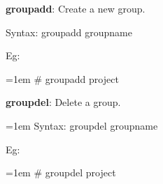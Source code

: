 \setlength{\columnsep}{3pt}
\begin{flushleft}
	
	\bigskip
	\textbf{groupadd}: Create a new group.
	\begin{tcolorbox}[breakable,notitle,boxrule=1pt,colback=pink,colframe=pink]
		\color{black}
		Syntax:  groupadd groupname
	\end{tcolorbox}
	Eg:
	\begin{tcolorbox}[breakable,notitle,boxrule=-0pt,colback=black,colframe=black]
		\color{green}
		\font=1em
		\# groupadd project
		\font=4pt
	\end{tcolorbox}

		
	\textbf{groupdel}: Delete a group.
	\begin{tcolorbox}[breakable,notitle,boxrule=0pt,colback=pink,colframe=pink]
			\color{black}
			\font=1em
			Syntax: groupdel groupname
			\font=4pt
	\end{tcolorbox}
	Eg:
	\begin{tcolorbox}[breakable,notitle,boxrule=-0pt,colback=black,colframe=black]
		\color{green}
		\font=1em
		\# groupdel project
		\font=4pt
	\end{tcolorbox}

	
	
\end{flushleft}

\newpage
